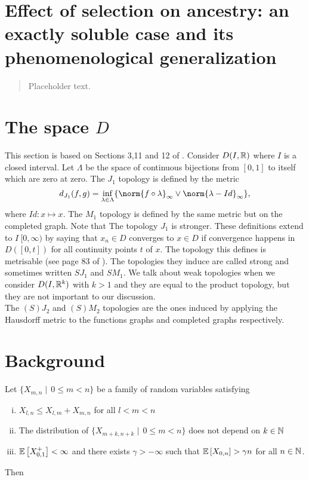 \section{Effect of selection on ancestry: an exactly soluble case and its phenomenological generalization}\label{dec:}

\begin{quote}
{\small Placeholder text. }
\end{quote}

\section{The space $D$}
This section is based on Sections 3,11 and 12 of \cite{jacod2013limit}. Consider $D(I, \mathbb{R})$ where $I$ is a closed interval. 
Let $\Lambda$ be the space of continuous bijections from $[0,1]$ to itself which are zero at zero. The $J_1$ topology is defined by the metric
\begin{equation}
d_{J_1}(f,g) = \inf_{\lambda \in \Lambda} \{ \norm{f \circ \lambda}_{\infty} \lor \norm{\lambda - Id}_{\infty} \}, 
\end{equation}
where $Id : x \mapsto x$. The $M_1$ topology is defined by the same metric but on the completed graph. Note that The topology $J_1$ is stronger. These definitions extend to $I \ [0, \infty)$ by saying that $x_n \in D$ converges to $x \in D$ if convergence happens in $D([0, t])$ for all continuity points $t$ of $x$. The topology this defines is metrisable (see page 83 of \cite{jacod2013limit}). The topologies they induce are called strong and sometimes written $SJ_1$ and $SM_1$. We talk about weak topologies when we consider $D(I, \mathbb{R}^k)$ with $k > 1$ and they are equal to the product topology, but they are not important to our discussion. \\

The $(S)J_2$ and $(S)M_2$ topologies are the ones induced by applying the Hausdorff metric to the functions graphs and completed graphs respectively. 


\section{Background}
\begin{theorem}
Let $\{X_{m,n} \mid\, 0 \leq m < n\}$ be a family of random variables satisfying 
\begin{enumerate}[(i)]
\item $X_{l,n} \leq X_{l,m} + X_{m, n}$ for all $l < m < n$
\item The distribution of $\{X_{m + k, n + k} \mid\, 0 \leq m < n\}$ does not depend on $k \in \mathbb{N}$
\item $\mathbb{E}\left[ X_{0,1}^+ \right] < \infty$ and there exists $\gamma > -\infty$ such that $\mathbb{E}\left[ X_{0,n} \right] > \gamma n$ for all $n \in \mathbb{N}$. 
\end{enumerate}
Then 
\end{theorem}

